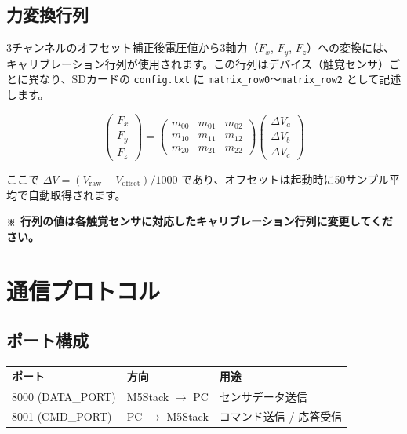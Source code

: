 \documentclass[a4paper,10pt]{ltjsarticle}
\begin{document}
\subsection{力変換行列}

3チャンネルのオフセット補正後電圧値から3軸力（$F_x$, $F_y$, $F_z$）への変換には、キャリブレーション行列が使用されます。この行列はデバイス（触覚センサ）ごとに異なり、SDカードの \texttt{config.txt} に \texttt{matrix\_row0}〜\texttt{matrix\_row2} として記述します。

$$
\begin{pmatrix} F_x \\ F_y \\ F_z \end{pmatrix}
=
\begin{pmatrix}
m_{00} & m_{01} & m_{02} \\
m_{10} & m_{11} & m_{12} \\
m_{20} & m_{21} & m_{22}
\end{pmatrix}
\begin{pmatrix} \Delta V_a \\ \Delta V_b \\ \Delta V_c \end{pmatrix}
$$

ここで $\Delta V = (V_{\mathrm{raw}} - V_{\mathrm{offset}}) / 1000$ であり、オフセットは起動時に50サンプル平均で自動取得されます。

\vspace{1em}
\noindent\textbf{※ 行列の値は各触覚センサに対応したキャリブレーション行列に変更してください。}

\section{通信プロトコル}

\subsection{ポート構成}

\begin{table}[h]
\centering
\begin{tabular}{lll}
\toprule
\textbf{ポート} & \textbf{方向} & \textbf{用途} \\
\midrule
8000 (DATA\_PORT) & M5Stack $\to$ PC & センサデータ送信 \\
8001 (CMD\_PORT)  & PC $\to$ M5Stack & コマンド送信 / 応答受信 \\
\bottomrule
\end{tabular}
\end{table}
\end{document}
